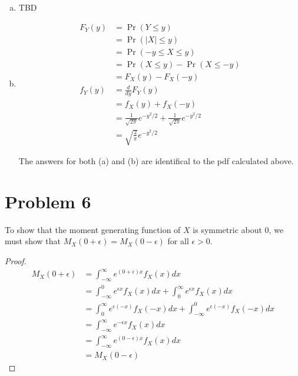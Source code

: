 \documentclass[11pt]{article}
\begin{document}
\begin{enumerate}[(a)]
    \item TBD

    \item 
      \begin{align*}
        F_Y(y) &= \Pr(Y \le y) \\
        &= \Pr(|X| \le y) \\
        &= \Pr(-y \le X \le y) \\
        &= \Pr(X \le y) - \Pr(X \le -y) \\
        &= F_X(y) - F_X(-y) \\
        f_Y(y) &= \frac{d}{dy} F_Y(y) \\
        &= f_X(y) + f_X(-y) \\
        &= \frac{1}{\sqrt{2 \pi}} e^{-y^2/2} + \frac{1}{\sqrt{2 \pi}} e^{-y^2/2} \\
        &= \sqrt{\frac{2}{\pi}} e^{-y^2/2}
      \end{align*}

      The answers for both (a) and (b) are identifical to the pdf calculated above.

\end{enumerate}

\section*{Problem 6}

To show that the moment generating function of $X$ is symmetric about 0, we must show that $M_X(0 + \epsilon) = M_X(0 - \epsilon)$ for all $\epsilon > 0$.

\begin{proof}

\begin{align*}
  M_X(0 + \epsilon) &= \int_{-\infty}^{\infty} e^{(0+\epsilon)x}f_X(x) dx \\
  &= \int_{-\infty}^0 e^{\epsilon x} f_X(x) dx + \int_0^{\infty} e^{\epsilon x} f_X(x) dx \\
  &= \int_0^{\infty} e^{\epsilon (-x)} f_X(-x) dx + \int_{-\infty}^0 e^{\epsilon (-x)} f_X(-x) dx \\
  &= \int_{-\infty}^{\infty} e^{-\epsilon x} f_X(x) dx \\
  &= \int_{-\infty}^{\infty} e^{(0-\epsilon)x} f_X(x) dx \\
  &= M_X(0-\epsilon)
\end{align*}

\end{proof}
\end{document}
